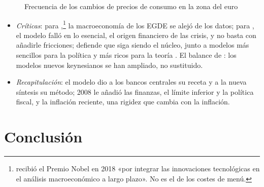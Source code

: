 \documentclass[11pt]{article}
\begin{document}
\begin{figure}[H]
\centering
\caption{Frecuencia de los cambios de precios de consumo en la zona del euro}\label{fig:frecuencia-precios}
\end{figure}

\begin{itemize}
\item \emph{Críticas}: para  \parencite*{Romer2016Trouble},\footnote{ recibió el Premio Nobel en 2018 «por integrar las innovaciones tecnológicas en el análisis macroeconómico a largo plazo»\nocite{Nobel2018Romer}. No es el  de los costes de menú.} la macroeconomía de los EGDE se alejó de los datos; para \textcite{Stiglitz2018Wrong}, el modelo falló en lo esencial, el origen financiero de las crisis, y no basta con añadirle fricciones; \textcite{Blanchard2018Future} defiende que siga siendo el núcleo, junto a modelos más sencillos para la política y más ricos para la teoría . El balance de \textcite{Gali2018State}: los modelos nuevos keynesianos se han ampliado, no sustituido.
\item \emph{Recapitulación}: el modelo dio a los bancos centrales su receta y a la nueva síntesis su método; 2008 le añadió las finanzas, el límite inferior y la política fiscal, y la inflación reciente, una rigidez que cambia con la inflación.
\end{itemize}


\clearpage
\section*{Conclusión}
\end{document}
